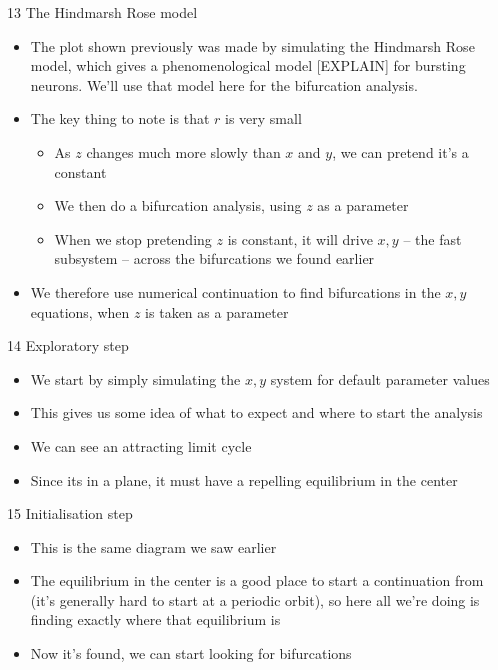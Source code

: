 \documentclass[presentation]{beamer}
\begin{document}
\begin{frame}[label={sec:orgc79b9d0}]{13 The Hindmarsh Rose model}
\begin{itemize}
\item The plot shown previously was made by simulating the Hindmarsh Rose model, which gives a phenomenological model [EXPLAIN] for bursting neurons. We'll use that model here for the bifurcation analysis.
\item The key thing to note is that \(r\) is very small
\begin{itemize}
\item As \(z\) changes much more slowly than \(x\) and \(y\), we can pretend it's a constant
\item We then do a bifurcation analysis, using \(z\) as a parameter
\item When we stop pretending \(z\) is constant, it will drive \(x,y\) -- the fast subsystem -- across the bifurcations we found earlier
\end{itemize}
\item We therefore use numerical continuation to find bifurcations in the \(x,y\) equations, when \(z\) is taken as a parameter
\end{itemize}
\end{frame}

\begin{frame}[label={sec:org36db54a}]{14 Exploratory step}
\begin{itemize}
\item We start by simply simulating the \(x,y\) system for default parameter values
\item This gives us some idea of what to expect and where to start the analysis
\item We can see an attracting limit cycle
\item Since its in a plane, it must have a repelling equilibrium in the center
\end{itemize}
\end{frame}

\begin{frame}[label={sec:orgae5a311}]{15 Initialisation step}
\begin{itemize}
\item This is the same diagram we saw earlier
\item The equilibrium in the center is a good place to start a continuation from (it's generally hard to start at a periodic orbit), so here all we're doing is finding exactly where that equilibrium is
\item Now it's found, we can start looking for bifurcations
\end{itemize}
\end{frame}
\end{document}
